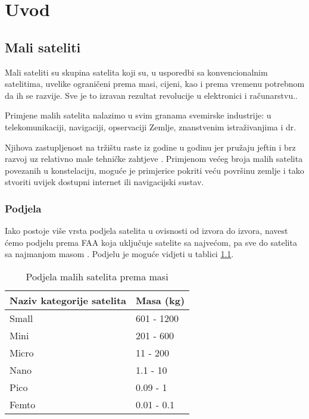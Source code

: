 \documentclass[times, utf8, diplomski, numeric]{templates/template}
\begin{document}
\chapter{Uvod}{
    \section{Mali sateliti}{
        Mali sateliti su skupina satelita koji su, u usporedbi sa konvencionalnim satelitima, uvelike ograničeni prema masi, cijeni, kao i prema vremenu potrebnom da ih se razvije. Sve je to izravan rezultat revolucije u elektronici i računarstvu.\cite{hrvatskiVojnik}.

        Primjene malih satelita nalazimo u svim granama svemirske industrije: u telekomunikaciji, navigaciji, opservaciji Zemlje, znanstvenim istraživanjima i dr.
        
        Njihova zastupljenost na tržištu raste iz godine u godinu jer pružaju jeftin i brz razvoj uz relativno male tehničke zahtjeve \cite{rastMalihSatelita}. Primjenom većeg broja malih satelita povezanih u konstelaciju, moguće je primjerice pokriti veću površinu zemlje i tako stvoriti uvijek dostupni internet ili navigacijski sustav.
        
        \subsection{Podjela}{
            Iako postoje više vrsta podjela satelita u ovisnosti od izvora do izvora, navest ćemo podjelu prema FAA  koja uključuje satelite sa najvećom, pa sve do satelita sa najmanjom masom \cite{podjelaPremaMasi}. Podjelu je moguće vidjeti u tablici \ref{tbl:podjelaSatelita}.

            \begin{table}[htb]
            \caption{Podjela malih satelita prema masi}
            \label{tbl:podjelaSatelita}
            \centering
            \begin{tabular}{ll} \toprule
            Naziv kategorije satelita & Masa (kg) \\ \midrule
            Small & 601 - 1200 \\
            Mini & 201 - 600 \\
            Micro & 11 - 200 \\
            Nano & 1.1 - 10 \\
            Pico & 0.09 - 1 \\
            Femto & 0.01 - 0.1 \\ \bottomrule
            \end{tabular}
            \end{table}

}}}
\end{document}
